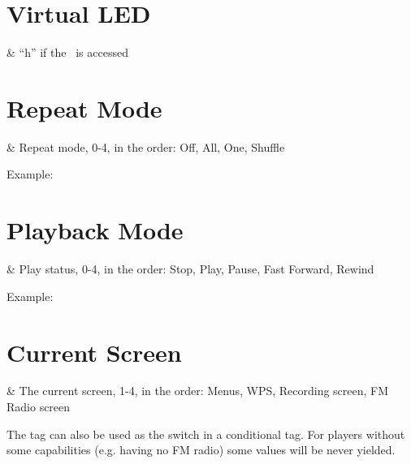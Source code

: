\section{Virtual LED}
\begin{table}
  \begin{tagmap}{}{}
     & ``h'' if the \disk\ is accessed\\
  \end{tagmap}
\end{table}

\section{Repeat Mode}
\begin{table}
  \begin{tagmap}{}{}
     & Repeat mode, 0-4, in the order: Off, All, One, Shuffle
           \\
  \end{tagmap}
\end{table}
Example: 

\section{Playback Mode}
\begin{table}
  \begin{tagmap}{}{}
     & Play status, 0-4, in the order: Stop, Play, Pause, 
           Fast Forward, Rewind\\
  \end{tagmap}
\end{table}
Example: 

\section{Current Screen}
\begin{table}
  \begin{tagmap}{}{}
     & The current screen, 1-4, in the order:
                Menus, WPS, Recording screen, FM Radio screen\\
  \end{tagmap}
\end{table}
The tag can also be used as the switch in a conditional tag. For players without
some capabilities (e.g. having no FM radio) some values will be never yielded.


